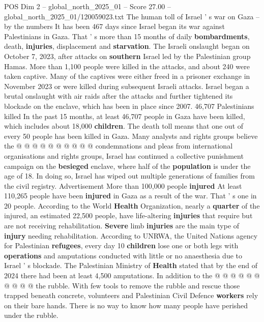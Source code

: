 \begin{textsample}{POS Dim 2 – global\_north\_2025\_01 – Score 27.00 – global\_north\_2025\_01/120059023.txt}  \label{ex:f2_pos_366}
The human toll of Israel ' s war on Gaza -- by the numbers It has been 467 days since Israel began its war against Palestinians in Gaza.
That ' s more than 15 months of daily \textbf{bombardments}, death, \textbf{injuries}, displacement and \textbf{starvation}.
The Israeli onslaught began on October 7, 2023, after attacks on \textbf{southern} Israel led by the Palestinian group Hamas.
More than 1,100 people were killed in the attacks, and about 240 were taken captive.
Many of the captives were either freed in a prisoner exchange in November 2023 or were killed during subsequent Israeli attacks.
Israel began a brutal onslaught with air raids after the attacks and further tightened its blockade on the enclave, which has been in place since 2007. 46,707 Palestinians killed In the past 15 months, at least 46,707 people in Gaza have been killed, which includes about 18,000 \textbf{children}.
The death toll means that one out of every 50 people has been killed in Gaza.
Many analysts and rights groups believe the @ @ @ @ @ @ @ @ @ @ condemnations and pleas from international organisations and rights groups, Israel has continued a collective punishment campaign on the \textbf{besieged} enclave, where half of the \textbf{population} is under the age of 18.
In doing so, Israel has wiped out multiple generations of families from the civil registry.
Advertisement More than 100,000 people \textbf{injured} At least 110,265 people have been \textbf{injured} in Gaza as a result of the war.
That ' s one in 20 people.
According to the World \textbf{Health} Organization, nearly a \textbf{quarter} of the injured, an estimated 22,500 people, have life-altering \textbf{injuries} that require but are not receiving rehabilitation. \textbf{Severe} limb \textbf{injuries} are the main type of \textbf{injury} needing rehabilitation.
According to UNRWA, the United Nations agency for Palestinian \textbf{refugees}, every day 10 \textbf{children} lose one or both legs with \textbf{operations} and amputations conducted with little or no anaesthesia due to Israel ' s blockade.
The Palestinian Ministry of \textbf{Health} stated that by the end of 2024 there had been at least 4,500 amputations.
In addition to the @ @ @ @ @ @ @ @ @ @ the rubble.
With few tools to remove the rubble and rescue those trapped beneath concrete, volunteers and Palestinian Civil Defence \textbf{workers} rely on their bare hands.
There is no way to know how many people have perished under the rubble.

\end{textsample}

